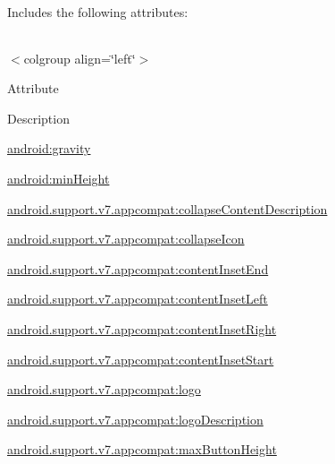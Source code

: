 Includes the following attributes\+:

\tabulinesep=1mm
\begin{longtabu} spread 0pt [c]{*{0}{|X[-1]}|}
\hline
\end{longtabu}
$<$colgroup align=\char`\"{}left\char`\"{}$>$ 

Attribute

Description 

{\ttfamily \hyperlink{classandroid_1_1support_1_1v7_1_1appcompat_1_1R_1_1styleable_a0b7088280f7c520251692daae225c6af}{android\+:gravity}}

{\ttfamily \hyperlink{classandroid_1_1support_1_1v7_1_1appcompat_1_1R_1_1styleable_a278fbe4009580f8f98dba7fedb82ccbb}{android\+:min\+Height}}

{\ttfamily \hyperlink{classandroid_1_1support_1_1v7_1_1appcompat_1_1R_1_1styleable_aec52a9c7ecfc4636844699ac144daa45}{android.\+support.\+v7.\+appcompat\+:collapse\+Content\+Description}}

{\ttfamily \hyperlink{classandroid_1_1support_1_1v7_1_1appcompat_1_1R_1_1styleable_a3e43f0fbbc70178e90fc837859e72471}{android.\+support.\+v7.\+appcompat\+:collapse\+Icon}}

{\ttfamily \hyperlink{classandroid_1_1support_1_1v7_1_1appcompat_1_1R_1_1styleable_a77f3e7561dfc11958910a87c4ffaf5be}{android.\+support.\+v7.\+appcompat\+:content\+Inset\+End}}

{\ttfamily \hyperlink{classandroid_1_1support_1_1v7_1_1appcompat_1_1R_1_1styleable_a70db7f911845893b9659eba7d5388946}{android.\+support.\+v7.\+appcompat\+:content\+Inset\+Left}}

{\ttfamily \hyperlink{classandroid_1_1support_1_1v7_1_1appcompat_1_1R_1_1styleable_a8195e4a7fe77915a6f6fda3aec2831c8}{android.\+support.\+v7.\+appcompat\+:content\+Inset\+Right}}

{\ttfamily \hyperlink{classandroid_1_1support_1_1v7_1_1appcompat_1_1R_1_1styleable_a57f32786084bf693a66215a7c9de31ca}{android.\+support.\+v7.\+appcompat\+:content\+Inset\+Start}}

{\ttfamily \hyperlink{classandroid_1_1support_1_1v7_1_1appcompat_1_1R_1_1styleable_ad17c84854643ce15da5744493c1e7f28}{android.\+support.\+v7.\+appcompat\+:logo}}

{\ttfamily \hyperlink{classandroid_1_1support_1_1v7_1_1appcompat_1_1R_1_1styleable_a0b18e2d1f2ae0e17ea6c1c72fbee6ad1}{android.\+support.\+v7.\+appcompat\+:logo\+Description}}

{\ttfamily \hyperlink{classandroid_1_1support_1_1v7_1_1appcompat_1_1R_1_1styleable_ae47cf713bfead553edda363c784fd33b}{android.\+support.\+v7.\+appcompat\+:max\+Button\+Height}}

